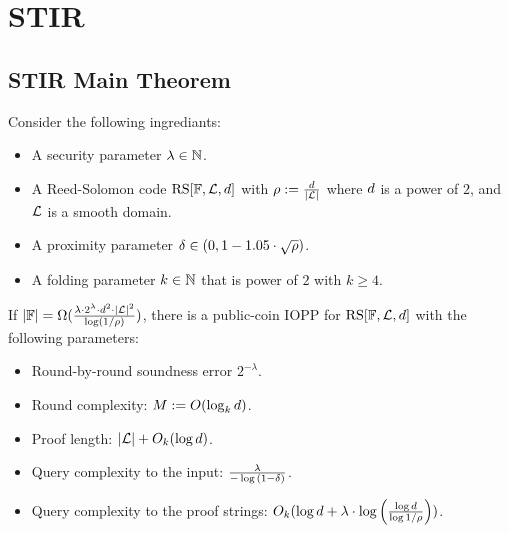 

\chapter{STIR}
\section{STIR Main Theorem}\label{sec:stir_thm}
\begin{theorem}\label{thm:stir}
    Consider the following ingrediants:
    \begin{itemize}
        \item A security parameter $\lambda\in\mathbb{N}$.
        \item A Reed-Solomon code $\mathrm{RS}[\mathbb{F},\mathcal{L},d]$ with $\rho:=\frac{d}{|\mathcal{L}|}$ where $d$ is a power of $2$, and $\mathcal{L}$ is a smooth domain.
        \item A proximity parameter $\delta\in(0,1-1.05\cdot\sqrt{\rho})$.
        \item A folding parameter $k\in\mathbb{N}$ that is power of $2$ with $k\geq 4$.
    \end{itemize}
If $|\mathbb{F}|=\Omega(\frac{\lambda\cdot2^\lambda\cdot d^2\cdot{|\mathcal{L}|}^2}{\log(1/\rho)})$, there is a public-coin IOPP for $\mathrm{RS}[\mathbb{F},\mathcal{L},d]$ with the following parameters:
\begin{itemize}
    \item Round-by-round soundness error $2^{-\lambda}$.
    \item Round complexity: $M:=O(\log_k{d})$.
    \item Proof length: $|\mathcal{L}|+O_k(\log{d})$.
    \item Query complexity to the input: $\frac{\lambda}{-\log{(1-\delta)}}$.
    \item Query complexity to the proof strings: $O_k(\log{d}+\lambda\cdot\log{\Big(\frac{\log{d}}{\log{1/\rho}}\Big)})$.
\end{itemize}
\end{theorem}

